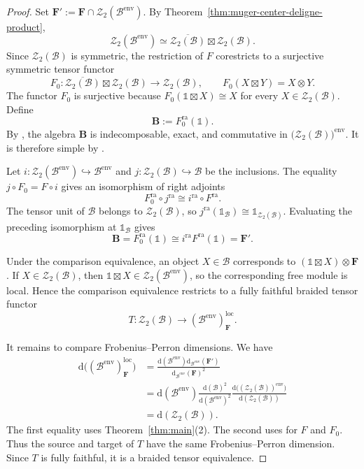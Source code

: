 \documentclass[10pt,a4paper]{amsart}
\numberwithin{equation}{section}
\newcommand{\unit}{\mathds{1}}
\newcommand{\B}{\mathcal{B}}
\newcommand{\Z}{\mathcal{Z}}
\newcommand{\loc}{\mathrm{loc}}
\newcommand{\ra}{\mathrm{ra}}
\newcommand{\FP}{\mathrm{d}}
\newcommand{\bF}{\mathbf{F}}
\begin{document}
\begin{proof}
Set $\bF':=\bF\cap\Z_2(\B^{\mathrm{env}})$. By
Theorem~\ref{thm:muger-center-deligne-product},
\[
  \Z_2(\B^{\mathrm{env}})
  \simeq
  \overline{\Z_2(\B)}\boxtimes\Z_2(\B).
\]
Since $\Z_2(\B)$ is symmetric, the restriction of $F$ corestricts to a
surjective symmetric tensor functor
\[
  F_0:\overline{\Z_2(\B)}\boxtimes\Z_2(\B)
  \longrightarrow\Z_2(\B),
  \qquad
  F_0(X\boxtimes Y)=X\otimes Y.
\]
The functor $F_0$ is surjective because
$F_0(\unit\boxtimes X)\cong X$ for every $X\in\Z_2(\B)$. Define
\[
  \mathbf{B}:=F_0^\ra(\unit).
\]
By \cite[Proposition~6.6]{shimizu2026commutative}, the algebra $\mathbf B$
is indecomposable, exact, and commutative in
$\bigl(\Z_2(\B)\bigr)^{\mathrm{env}}$. It is therefore simple by
\cite[Theorem~7.1]{coulembier2025simple}.

Let $i:\Z_2(\B^{\mathrm{env}})\hookrightarrow\B^{\mathrm{env}}$ and
$j:\Z_2(\B)\hookrightarrow\B$ be the inclusions. The equality
$j\circ F_0=F\circ i$ gives an isomorphism of right adjoints
\[
  F_0^{\ra}\circ j^{\ra}\cong i^{\ra}\circ F^\ra.
\]
The tensor unit of $\B$ belongs to $\Z_2(\B)$, so
$j^{\ra}(\unit_{\B})\cong\unit_{\Z_2(\B)}$. Evaluating the preceding
isomorphism at $\unit_{\B}$ gives
\[
  \mathbf{B} = F_0^{\ra}(\unit) \cong i^{\ra} F^\ra(\unit) = \bF'.
\]

Under the comparison equivalence, an object $X\in\B$ corresponds to
$(\unit\boxtimes X)\otimes\bF$. If $X\in\Z_2(\B)$, then
$\unit\boxtimes X\in\Z_2(\B^{\mathrm{env}})$, so the corresponding free
module is local. Hence the comparison equivalence restricts to a fully
faithful braided tensor functor
\[
  T:\Z_2(\B)\longrightarrow(\B^{\mathrm{env}})_\bF^\loc.
\]

It remains to compare Frobenius--Perron dimensions. We have
\[
\begin{aligned}
\FP\bigl((\B^{\mathrm{env}})_\bF^\loc\bigr)
&=
\frac{
  \FP(\B^{\mathrm{env}})\FP_{\B^{\mathrm{env}}}(\bF')
}{
  \FP_{\B^{\mathrm{env}}}(\bF)^2
}
\\
&=
\FP(\B^{\mathrm{env}})
\frac{\FP(\B)^2}{\FP(\B^{\mathrm{env}})^2}
\frac{
  \FP\bigl((\Z_2(\B))^{\mathrm{env}}\bigr)
}{
  \FP(\Z_2(\B))
}
\\
&=
\FP(\Z_2(\B)).
\end{aligned}
\]
The first equality uses Theorem~\ref{thm:main}(2). The second uses
\cite[Proposition~6.6(d)]{shimizu2026commutative} for $F$ and $F_0$.
Thus the source and target of $T$ have the same Frobenius--Perron dimension.
Since $T$ is fully faithful, it is a braided tensor equivalence.
\end{proof}
\end{document}
